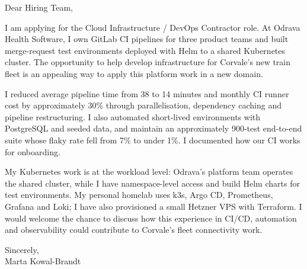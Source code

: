\documentclass[11pt,a4paper]{article}
\begin{document}
Dear Hiring Team,

I am applying for the Cloud Infrastructure / DevOps Contractor role. At Odrava Health Software, I own GitLab CI pipelines for three product teams and built merge-request test environments deployed with Helm to a shared Kubernetes cluster. The opportunity to help develop infrastructure for Corvale’s new train fleet is an appealing way to apply this platform work in a new domain.

I reduced average pipeline time from 38 to 14 minutes and monthly CI runner cost by approximately 30\% through parallelisation, dependency caching and pipeline restructuring. I also automated short-lived environments with PostgreSQL and seeded data, and maintain an approximately 900-test end-to-end suite whose flaky rate fell from 7\% to under 1\%. I documented how our CI works for onboarding.

My Kubernetes work is at the workload level: Odrava’s platform team operates the shared cluster, while I have namespace-level access and build Helm charts for test environments. My personal homelab uses k3s, Argo CD, Prometheus, Grafana and Loki; I have also provisioned a small Hetzner VPS with Terraform. I would welcome the chance to discuss how this experience in CI/CD, automation and observability could contribute to Corvale’s fleet connectivity work.

Sincerely,\\
Marta Kowal-Brandt
\end{document}
